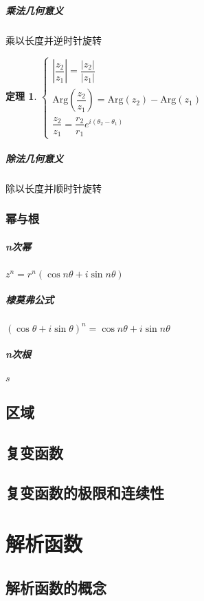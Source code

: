 \documentclass[UTF8,a4paper,12pt,scheme=chinese]{ctexbook}
\newcommand{\Arg}{\mathrm{Arg}}
\newtheorem{theorem}{定理}[chapter]
\theoremstyle{plain}
\begin{document}
	\paragraph{乘法几何意义}乘以长度并逆时针旋转
	\begin{theorem}
		$\left\lbrace
		\begin{array}{l} 
		\left| \dfrac{z_2}{z_1}\right| =\dfrac{|z_2|}{|z_1|}\\
		\Arg\left( \dfrac{z_2}{z_1}\right) =\Arg(z_2)-\Arg(z_1)\\
		\dfrac{z_2}{z_1}=\dfrac{r_2}{r_1}e^{i(\theta_2-\theta_1)}
		\end{array}
		\right. $
	\end{theorem}
	\paragraph{除法几何意义}除以长度并顺时针旋转
	\subsection{幂与根}
	\paragraph{n次幂}$ z^n=r^n(\cos n\theta+i\sin n\theta) $
	\paragraph{棣莫弗公式}$ (\cos\theta+i\sin\theta)^n=\cos n\theta+i\sin n\theta $
	\paragraph{n次根}$ s$
	\section{区域}
	\section{复变函数}
	\section{复变函数的极限和连续性}
	\chapter{解析函数}
	\section{解析函数的概念}
	
\end{document}
